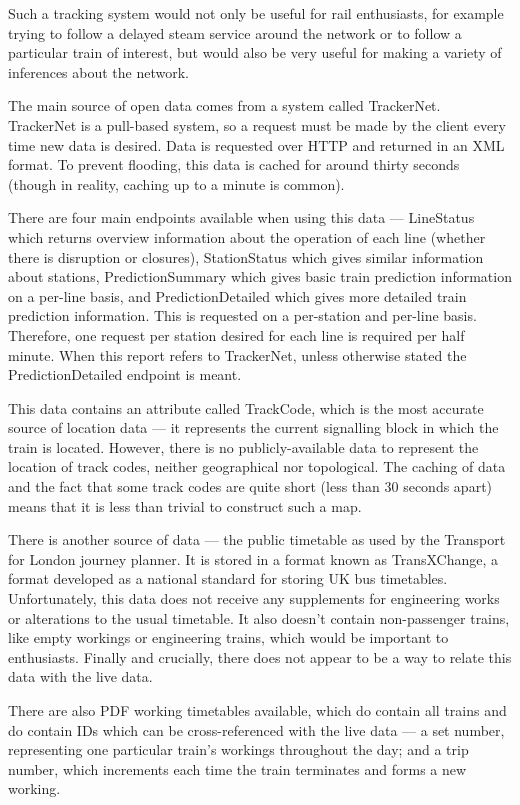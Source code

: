 \documentclass[a4paper,12pt]{report}
\begin{document}
Such a tracking system would not only be useful for rail enthusiasts, for
example trying to follow a delayed steam service around the network or to
follow a particular train of interest, but would also be very useful for making
a variety of inferences about the network.

The main source of open data comes from a system called TrackerNet. TrackerNet
is a pull-based system, so a request must be made by the client every time new
data is desired. Data is requested over HTTP and returned in an XML format. To
prevent flooding, this data is cached for around thirty seconds (though in
reality, caching up to a minute is common).

There are four main endpoints available when using this data --- LineStatus
which returns overview information about the operation of each line (whether
there is disruption or closures), StationStatus which gives similar information
about stations, PredictionSummary which gives basic train prediction
information on a per-line basis, and PredictionDetailed which gives more
detailed train prediction information. This is requested on a per-station and
per-line basis\cite{TrackerNetSpec}. Therefore, one request per station desired
for each line is required per half minute. When this report refers to
TrackerNet, unless otherwise stated the PredictionDetailed endpoint is meant.

This data contains an attribute called TrackCode, which is the most accurate
source of location data --- it represents the current signalling block in which
the train is located. However, there is no publicly-available data to represent
the location of track codes, neither geographical nor topological. The caching
of data and the fact that some track codes are quite short (less than 30
seconds apart) means that it is less than trivial to construct such a map.

There is another source of data --- the public timetable as used by the
Transport for London journey planner. It is stored in a format known as
TransXChange, a format developed as a national standard for storing UK bus
timetables\cite{TransXChangeSpec}. Unfortunately, this data does not receive
any supplements for engineering works or alterations to the usual timetable. It
also doesn't contain non-passenger trains, like empty workings or engineering
trains, which would be important to enthusiasts. Finally and crucially, there
does not appear to be a way to relate this data with the live data.

There are also PDF working timetables available\cite{TfLWTT}, which do contain
all trains and do contain IDs which can be cross-referenced with the live data
--- a set number, representing one particular train's workings throughout the
day; and a trip number, which increments each time the train terminates and
forms a new working.
\end{document}
